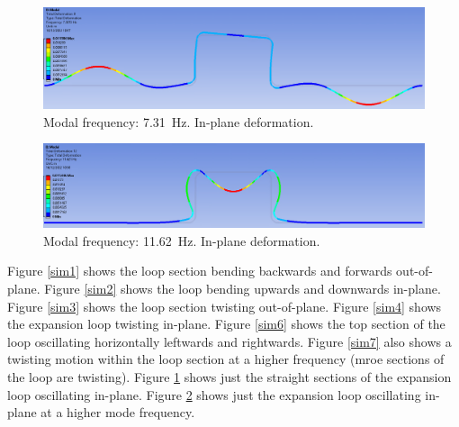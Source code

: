 \begin{figure}[H]
    \centering
    \includegraphics[width = 0.9 \textwidth]{img/fig19.png}
    \caption{Modal frequency: \SI{7.31}{\hertz}. In-plane deformation.}
    \label{sim9}
\end{figure}

\begin{figure}[H]
    \centering
    \includegraphics[width = 0.9 \textwidth]{img/fig22.png}
    \caption{Modal frequency: \SI{11.62}{\hertz}. In-plane deformation.}
    \label{sim12}
\end{figure}
Figure \ref{sim1} shows the loop section bending backwards and forwards out-of-plane. Figure \ref{sim2} shows the loop bending upwards and downwards in-plane. Figure \ref{sim3} shows the loop section twisting out-of-plane. Figure \ref{sim4} shows the expansion loop twisting in-plane. Figure \ref{sim6} shows the top section of the loop oscillating horizontally leftwards and rightwards. Figure \ref{sim7} also shows a twisting motion within the loop section at a higher frequency (mroe sections of the loop are twisting). Figure \ref{sim9} shows just the straight sections of the expansion loop oscillating in-plane. Figure \ref{sim12} shows just the expansion loop oscillating in-plane at a higher mode frequency.
